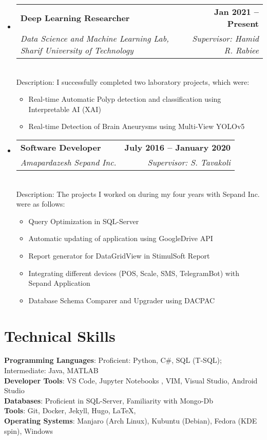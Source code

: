 \documentclass[letterpaper,11pt]{article}
\makeatletter
\newcommand{\resumeItem}[1]{
  \item\small{
    {#1 \vspace{-2pt}}
  }
}
\newcommand{\resumeSubheadingD}[5]{
  \vspace{-2pt}\item
    \begin{tabular*}{1.0\textwidth}[t]{l@{\extracolsep{\fill}}r}
      \textbf{#1} & \textbf{\small #2} \\
    \textcolor{sgray} {\textit{\small#3}} & \textcolor{sgray}{ \textit{\small #4} }\\
    \end{tabular*} %
    \\ \vspace{3pt}
    Description:{#5}
}
\newcommand{\resumeSubHeadingListStart}{\begin{itemize}[leftmargin=0.0in, label={}]}
\newcommand{\resumeSubHeadingListEnd}{\end{itemize}}
\newcommand{\resumeItemListStart}{\begin{itemize}}
\newcommand{\resumeItemListEnd}{\end{itemize}
\vspace{-5pt}
}
\makeatother
\begin{document}
\resumeSubHeadingListStart
\resumeSubheadingD
{Deep Learning Researcher }{Jan 2021 – Present}
{Data Science and Machine Learning Lab, Sharif University of Technology }{Supervisor: Hamid R. Rabiee}
{ I successfully completed two laboratory projects, which were:
 }

\resumeItemListStart
\resumeItem{Real-time Automatic Polyp detection and classification using Interpretable AI (XAI)}
\resumeItem{Real-time Detection of Brain Aneurysms using Multi-View YOLOv5}
\resumeItemListEnd 

\resumeSubHeadingListEnd

\resumeSubHeadingListStart
\resumeSubheadingD
{Software Developer }{July 2016 – January 2020}
{Amapardazesh Sepand Inc. }{Supervisor: S. Tavakoli}
{ The projects I worked on during my four years with Sepand Inc. were as follows: }

\resumeItemListStart
\resumeItem{Query Optimization in SQL-Server}
\resumeItem{Automatic updating of application using GoogleDrive API}
\resumeItem{ Report generator for DataGridView in StimulSoft Report }
\resumeItem{Integrating different devices (POS, Scale, SMS, TelegramBot) with Sepand Application}
\resumeItem{Database Schema Comparer and Upgrader using DACPAC}
\resumeItemListEnd 

\resumeSubHeadingListEnd

\begin{comment}
\resumeSubHeadingListStart
\resumeSubheadingD
{English Teacher }{July 2017 – January 2018}
{Zaban Gostar Institute  }{Supervisor: F. Fatemi}
{ I served as an English teacher for pre-intermediate students for one semester
}
\resumeSubHeadingListEnd
\end{comment} 


\section{Technical Skills}
\begin{itemize}[leftmargin=0.15in, 
	label={}
	]
	\small{\item{
			\textbf{Programming Languages}{: Proficient: Python, C\#, SQL (T-SQL); Intermediate: Java, MATLAB } \\
			\textbf{Developer Tools}{:  VS Code, Jupyter Notebooks , VIM, Visual Studio, Android Studio} \\
			\textbf{Databases}{: Proficient in SQL-Server, Familiarity with Mongo-Db } \\
			\textbf{Tools}{: Git, Docker, Jekyll, Hugo, \LaTeX , } \\
			\textbf{Operating Systems}{: Manjaro  (Arch Linux), Kubuntu  (Debian), Fedora (KDE spin), Windows } \\
	}}
\end{itemize}
\vspace{-16pt}
\end{document}
